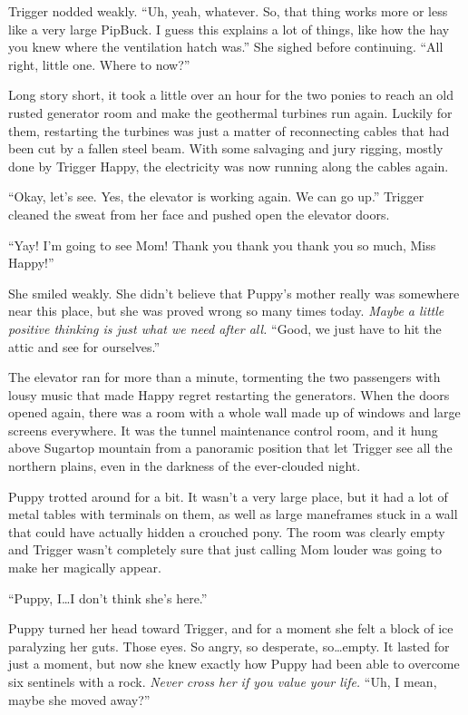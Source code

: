 Trigger nodded weakly. ``Uh, yeah, whatever. So, that thing works more or less like a very large PipBuck. I guess this explains a lot of things, like how the hay you knew where the ventilation hatch was.'' She sighed before continuing. ``All right, little one. Where to now?''


\horizonline


Long story short, it took a little over an hour for the two ponies to reach an old rusted generator room and make the geothermal turbines run again. Luckily for them, restarting the turbines was just a matter of reconnecting cables that had been cut by a fallen steel beam. With some salvaging and jury rigging, mostly done by Trigger Happy, the electricity was now running along the cables again.

``Okay, let's see. Yes, the elevator is working again. We can go up.'' Trigger cleaned the sweat from her face and pushed open the elevator doors.

``Yay! I'm going to see Mom! Thank you thank you thank you so much, Miss Happy!''

She smiled weakly. She didn't believe that Puppy's mother really was somewhere near this place, but she was proved wrong so many times today. \emph{Maybe a little positive thinking is just what we need after all.} ``Good, we just have to hit the attic and see for ourselves.''

The elevator ran for more than a minute, tormenting the two passengers with lousy music that made Happy regret restarting the generators. When the doors opened again, there was a room with a whole wall made up of windows and large screens everywhere. It was the tunnel maintenance control room, and it hung above Sugartop mountain from a panoramic position that let Trigger see all the northern plains, even in the darkness of the ever-clouded night.

Puppy trotted around for a bit. It wasn't a very large place, but it had a lot of metal tables with terminals on them, as well as large maneframes stuck in a wall that could have actually hidden a crouched pony. The room was clearly empty and Trigger wasn't completely sure that just calling Mom louder was going to make her magically appear.

``Puppy, I\dots I don't think she's here.''

Puppy turned her head toward Trigger, and for a moment she felt a block of ice paralyzing her guts. Those eyes. So angry, so desperate, so\dots empty. It lasted for just a moment, but now she knew exactly how Puppy had been able to overcome six sentinels with a rock. \emph{Never cross her if you value your life.} ``Uh, I mean, maybe she moved away?''

